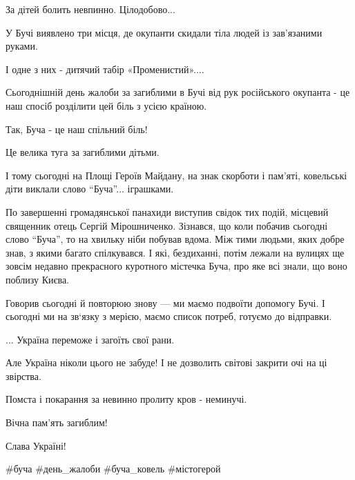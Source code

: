За дітей болить невпинно. Цілодобово... 

У Бучі виявлено три місця, де окупанти скидали тіла людей із зав’язаними
руками. 

І одне з них - дитячий табір «Променистий».... 

Сьогоднішній день жалоби за загиблими в Бучі від рук російського окупанта - це
наш спосіб розділити цей біль з усією країною. 

Так, Буча - це наш спільний біль! 

Це велика туга за загиблими дітьми. 

І тому сьогодні на Площі Героїв Майдану, на знак скорботи і пам'яті, ковельські
діти виклали слово \enquote{Буча}... іграшками.

По завершенні громадянської панахиди виступив свідок тих подій, місцевий
священник отець Сергій Мірошниченко. Зізнався, що коли побачив сьогодні слово
\enquote{Буча}, то на хвильку ніби побував вдома. Між тими людьми, яких добре
знав, з якими багато спілкувався. І які, бездиханні, потім лежали на вулицях ще
зовсім недавно прекрасного куротного містечка Буча, про яке всі знали, що воно
поблизу Києва. 

Говорив сьогодні й повторюю знову — ми маємо подвоїти допомогу Бучі. І сьогодні
ми на зв`язку з мерією, маємо список потреб, готуємо до відправки. 

... Україна переможе і загоїть свої рани.

Але Україна ніколи цього не забуде! І не дозволить світові закрити очі на ці звірства. 

Помста і покарання за невинно пролиту кров - неминучі. 

Вічна пам'ять загиблим! 

Слава Україні! 

\#буча \#день\_жалоби \#буча\_ковель \#містогерой
